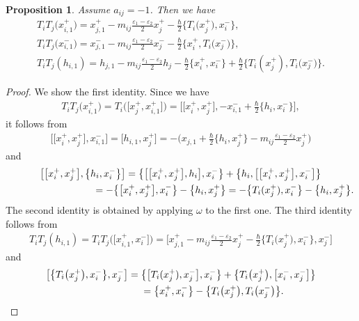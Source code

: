 \documentclass[10pt,a4paper]{amsart}
\newtheorem{prop}[thm]{Proposition}
\theoremstyle{definition}
\numberwithin{equation}{section}
\newcommand{\ve}{\varepsilon}
\begin{document}
\begin{prop}\label{prop:iji}Assume $a_{ij}=-1$. Then we have
\begin{gather*}
T_i T_j \big(x_{i,1}^+\big) = x_{j,1}^+ - m_{ij}\tfrac{\ve_1 - \ve_2}{2}x_j^+ - \tfrac{\hbar}{2}\big\{T_i\big(x_j^+\big),x_i^-\big\}, \\
T_i T_j \big(x_{i,1}^-\big) = x_{j,1}^- - m_{ij}\tfrac{\ve_1 - \ve_2}{2}x_j^- - \tfrac{\hbar}{2}\big\{x_i^+,T_i\big(x_j^-\big)\big\}, \\
T_i T_j (h_{i,1}) = h_{j,1} - m_{ij}\tfrac{\ve_1 - \ve_2}{2}h_j - \tfrac{\hbar}{2}\{x_i^+,x_i^-\} + \tfrac{\hbar}{2}\big\{T_i(x_j^+),T_i\big(x_j^-\big)\big\}.
\end{gather*}
\end{prop}
\begin{proof}We show the first identity. Since we have
\begin{gather*}
T_iT_j\big(x_{i,1}^+\big) = T_i\big(\big[x_{j}^+,x_{i,1}^+\big]\big) = \big[\big[x_i^+,x_j^+\big],-x_{i,1}^-+\tfrac{\hbar}{2}\big\{h_i,x_i^{-}\big\}\big],
\end{gather*}
it follows from
\begin{gather*}
\big[\big[x_i^+,x_j^+\big],x_{i,1}^-\big] = \big[h_{i,1},x_j^+\big] = -\big( x_{j,1} + \tfrac{\hbar}{2}\big\{h_i,x_j^{+}\big\} - m_{ij} \tfrac{\ve_1 - \ve_2}{2}x_j^+ \big)
\end{gather*}
and
\begin{gather*}
\big[\big[x_i^+,x_j^+\big],\big\{h_i,x_i^{-}\big\}\big]= \big\{\big[\big[x_i^+,x_j^+\big],h_i\big],x_i^-\big\} + \big\{h_i,\big[\big[x_i^+,x_j^+\big],x_i^-\big]\big\} \\
 \hphantom{\big[\big[x_i^+,x_j^+\big],\big\{h_i,x_i^{-}\big\}\big]}{} = -\big\{\big[x_i^+,x_j^+\big],x_i^-\big\} - \big\{h_i,x_j^{+}\big\} = -\big\{T_i(x_j^+),x_i^-\big\} - \big\{h_i,x_j^{+}\big\}.
\end{gather*}
The second identity is obtained by applying $\omega$ to the first one. The third identity follows from
\begin{gather*}
T_iT_j(h_{i,1})= T_iT_j\big(\big[x_{i,1}^+,x_{i}^-\big]\big) = \big[x_{j,1}^+-m_{ij}\tfrac{\ve_1-\ve_2}{2}x_j^+-\tfrac{\hbar}{2}\big\{T_i\big(x_j^+\big),x_i^-\big\},x_j^-\big]
\end{gather*}
and
\begin{gather*}
\big[\big\{T_i\big(x_j^+\big),x_i^-\big\},x_j^-\big] = \big\{\big[T_i(x_j^+),x_j^-\big],x_i^-\big\} + \big\{T_i\big(x_j^+\big),\big[x_i^-,x_j^-\big]\big\}\\
\hphantom{\big[\big\{T_i\big(x_j^+\big),x_i^-\big\},x_j^-\big]}{} = \big\{x_i^+,x_i^-\big\} - \big\{T_i\big(x_j^+\big),T_i\big(x_j^-\big)\big\}.\tag*{\qed}
\end{gather*}\renewcommand{\qed}{}
\end{proof}
\end{document}
